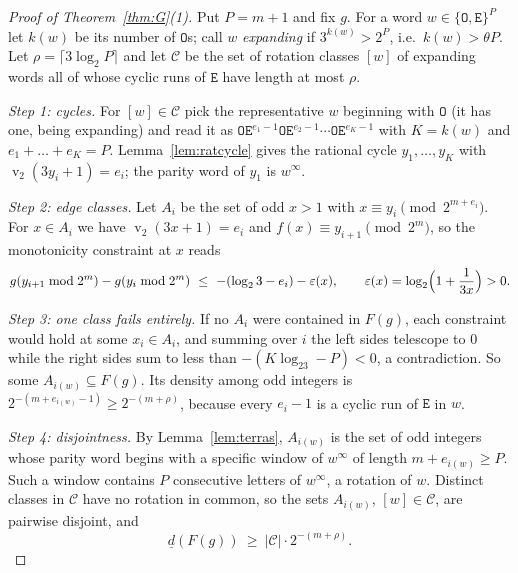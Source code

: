 \documentclass[11pt]{article}
\theoremstyle{definition}
\theoremstyle{remark}
\DeclareMathOperator{\vv}{v}
\begin{document}
\begin{proof}[Proof of Theorem~\ref{thm:G}(1)]
Put $P=m+1$ and fix $g$. For a word $w\in\{\mathtt O,\mathtt E\}^{P}$
let $k(w)$ be its number of $\mathtt O$s; call $w$ \emph{expanding} if
$3^{k(w)}>2^{P}$, i.e.\ $k(w)>\theta P$. Let $\rho=\lceil3\log_2P\rceil$
and let $\mathcal C$ be the set of rotation classes $[w]$ of expanding
words all of whose cyclic runs of $\mathtt E$ have length at most $\rho$.

\emph{Step 1: cycles.} For $[w]\in\mathcal C$ pick the representative
$w$ beginning with $\mathtt O$ (it has one, being expanding) and read it
as $\mathtt O\mathtt E^{e_1-1}\mathtt O\mathtt E^{e_2-1}\cdots\mathtt O\mathtt E^{e_K-1}$
with $K=k(w)$ and $e_1+\dots+e_K=P$. Lemma~\ref{lem:ratcycle} gives the
rational cycle $y_1,\dots,y_K$ with $\vv_2(3y_i+1)=e_i$; the parity word
of $y_1$ is $w^{\infty}$.

\emph{Step 2: edge classes.} Let $A_i$ be the set of odd $x>1$ with
$x\equiv y_i\pmod{2^{m+e_i}}$. For $x\in A_i$ we have $\vv_2(3x+1)=e_i$
and $f(x)\equiv y_{i+1}\pmod{2^{m}}$, so the monotonicity constraint at
$x$ reads
\[
g(y_{i+1}\bmod2^{m})-g(y_i\bmod2^{m})\ \le\ -(\log_23-e_i)-\varepsilon(x),
\qquad \varepsilon(x)=\log_2\Bigl(1+\frac1{3x}\Bigr)>0 .
\]

\emph{Step 3: one class fails entirely.} If no $A_i$ were contained in
$F(g)$, each constraint would hold at some $x_i\in A_i$, and summing over
$i$ the left sides telescope to $0$ while the right sides sum to less than
$-(K\log_23-P)<0$, a contradiction. So some $A_{i(w)}\subseteq F(g)$. Its
density among odd integers is $2^{-(m+e_{i(w)}-1)}\ge2^{-(m+\rho)}$,
because every $e_i-1$ is a cyclic run of $\mathtt E$ in $w$.

\emph{Step 4: disjointness.} By Lemma~\ref{lem:terras}, $A_{i(w)}$ is the
set of odd integers whose parity word begins with a specific window of
$w^{\infty}$ of length $m+e_{i(w)}\ge P$. Such a window contains $P$
consecutive letters of $w^{\infty}$, a rotation of $w$. Distinct classes
in $\mathcal C$ have no rotation in common, so the sets $A_{i(w)}$,
$[w]\in\mathcal C$, are pairwise disjoint, and
\[
\underline d(F(g))\ \ge\ |\mathcal C|\cdot2^{-(m+\rho)} .
\]


\end{proof}
\end{document}
